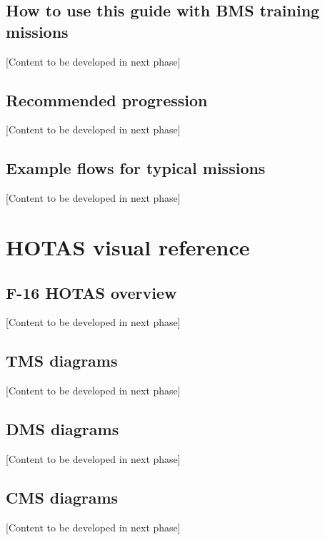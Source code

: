 \documentclass[11pt,a4paper]{article}
\begin{document}
\subsection{How to use this guide with BMS training missions}

[Content to be developed in next phase]

\subsection{Recommended progression}

[Content to be developed in next phase]

\subsection{Example flows for typical missions}

[Content to be developed in next phase]

\section{HOTAS visual reference}
\subsection{F-16 HOTAS overview}

[Content to be developed in next phase]

\subsection{TMS diagrams}

[Content to be developed in next phase]

\subsection{DMS diagrams}

[Content to be developed in next phase]

\subsection{CMS diagrams}

[Content to be developed in next phase]
\end{document}
